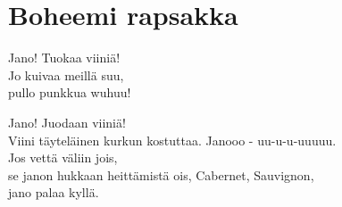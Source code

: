 \section{Boheemi rapsakka}

Jano! Tuokaa viiniä! \\
Jo kuivaa meillä suu, \\
pullo punkkua wuhuu!

Jano! Juodaan viiniä! \\
Viini täyteläinen kurkun kostuttaa. Janooo - uu-u-u-uuuuu. \\
Jos vettä väliin jois, \\
se janon hukkaan heittämistä ois, Cabernet, Sauvignon, \\
jano palaa kyllä.